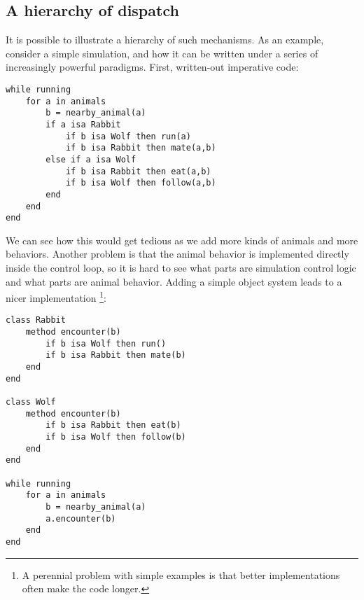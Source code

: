 

\subsection{A hierarchy of dispatch}

It is possible to illustrate a hierarchy of such mechanisms.
As an example, consider a simple simulation, and how it can be written
under a series of increasingly powerful paradigms. First, written-out
imperative code:

\begin{singlespace}
\begin{verbatim}
while running
    for a in animals
        b = nearby_animal(a)
        if a isa Rabbit
            if b isa Wolf then run(a)
            if b isa Rabbit then mate(a,b)
        else if a isa Wolf
            if b isa Rabbit then eat(a,b)
            if b isa Wolf then follow(a,b)
        end
    end
end
\end{verbatim}
\end{singlespace}

We can see how this would get tedious as we add more kinds of animals
and more behaviors.
Another problem is that the animal behavior is
implemented directly inside the control loop, so it is hard to see
what parts are simulation control logic and what parts are animal
behavior.
Adding a simple object system leads to a nicer implementation
\footnote{A perennial problem with simple examples is that better
implementations often make the code longer.}:

\begin{singlespace}
\begin{verbatim}
class Rabbit
    method encounter(b)
        if b isa Wolf then run()
        if b isa Rabbit then mate(b)
    end
end

class Wolf
    method encounter(b)
        if b isa Rabbit then eat(b)
        if b isa Wolf then follow(b)
    end
end

while running
    for a in animals
        b = nearby_animal(a)
        a.encounter(b)
    end
end
\end{verbatim}
\end{singlespace}

